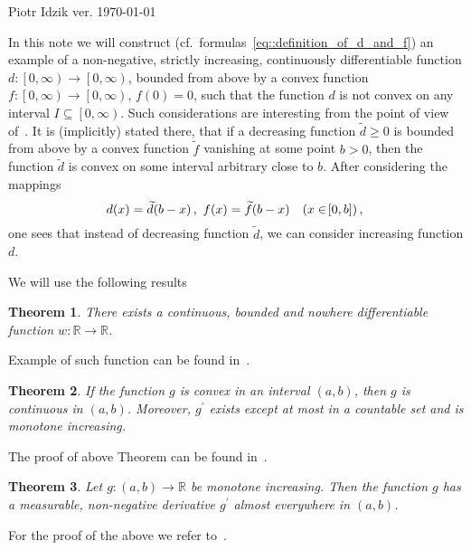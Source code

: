 \documentclass[12pt]{article}
\newcommand{\R}{\mathbb{R}}
\renewcommand{\geq}{\geqslant}
\newcommand{\paren}[1]{\! \left(#1 \right)}
\newcommand{\bracket}[1]{\! \left[#1 \right]}
\theoremstyle{plain}
\newtheorem{theorem}{Theorem}
\theoremstyle{definition}
\theoremstyle{remark}
\begin{document}
\noindent Piotr Idzik \hfill ver. \today\ \currenttime{}

\vspace*{1cm}
In this note we will construct (cf.\ formulas~\eqref{eq::definition_of_d_and_f}) an example of
a non-negative, strictly increasing, continuously differentiable function $d \colon \left[0, \infty \right) \to \left[0, \infty \right)$,
bounded from above by a convex function $f\colon\left[0, \infty \right) \to \left[0, \infty \right)$, $f\paren{0} = 0$,
such that the function $d$ is not convex on any interval $I \subseteq \left[0, \infty \right)$.
Such considerations are interesting from the point of view of~\cite[p. 167]{Levandosky1998}.
It is (implicitly) stated there, that if a decreasing function
$\widetilde{d} \geq 0$ is bounded from above by a convex function $\widetilde{f}$
vanishing at some point $b > 0$,
then the function $\widetilde{d}$ is convex on some interval arbitrary close to $b$.
After considering the mappings
\begin{equation*}
    d\paren{x} =  \widetilde{d}\paren{b-x}, \ f\paren{x} =  \widetilde{f}\paren{b-x} \quad \paren{x \in \bracket{0, b}}, \\
\end{equation*}
one sees that instead of decreasing function $\widetilde{d}$, we can consider increasing function $d$.

We will use the following results
\begin{theorem}
    There exists a continuous, bounded and nowhere differentiable function $w \colon \R \to \R$.
\end{theorem}
Example of such function can be found in~\cite[Example 8, p. 38]{gelbaum1964counterexamples}.

\begin{theorem} \label{thm::convex_monotone_der}
    If the function $g$ is convex in an interval $\paren{a, b}$, then $g$ is continuous in $\paren{a, b}$.
    Moreover, $g^\prime$ exists except at most in a countable set and is monotone increasing.
\end{theorem}
The proof of above Theorem can be found in~\cite[Theorem 7.40, p. 120]{wheeden1977measure}.

\begin{theorem} \label{thm::monotone_diff_ae}
    Let $g \colon \paren{a, b} \to \R$ be monotone increasing.
    Then the function $g$ has a measurable, non-negative derivative $g^\prime$ almost everywhere in $\paren{a, b}$.
\end{theorem}
For the proof of the above we refer to~\cite[Theorem 7.21, page 111]{wheeden1977measure}.
\end{document}
